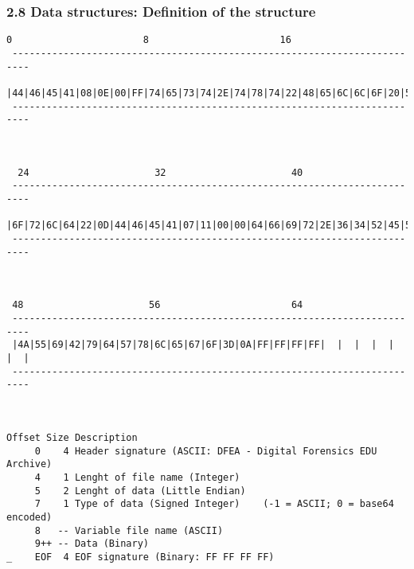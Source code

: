 \begin{frame}[fragile]
  \frametitle{2.8 Data structures: Definition of the structure}
\begin{lstlisting}[basicstyle=\tiny]
  0                       8                       16                      
 ------------------------------------------------------------------------- 
 |44|46|45|41|08|0E|00|FF|74|65|73|74|2E|74|78|74|22|48|65|6C|6C|6F|20|57|
 -------------------------------------------------------------------------
                                                        


  24                      32                      40
 -------------------------------------------------------------------------
 |6F|72|6C|64|22|0D|44|46|45|41|07|11|00|00|64|66|69|72|2E|36|34|52|45|5A|
 -------------------------------------------------------------------------
                   


 48                      56                       64
 -------------------------------------------------------------------------
 |4A|55|69|42|79|64|57|78|6C|65|67|6F|3D|0A|FF|FF|FF|FF|  |  |  |  |  |  |
 -------------------------------------------------------------------------



Offset Size Description
     0    4 Header signature (ASCII: DFEA - Digital Forensics EDU Archive)
     4    1 Lenght of file name (Integer)
     5    2 Lenght of data (Little Endian)
     7    1 Type of data (Signed Integer)    (-1 = ASCII; 0 = base64 encoded)
     8   -- Variable file name (ASCII)
     9++ -- Data (Binary)
_    EOF  4 EOF signature (Binary: FF FF FF FF)
\end{lstlisting}
\end{frame}


